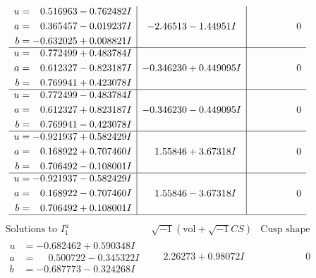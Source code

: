 \documentclass[1p]{elsarticle_modified}
\theoremstyle{definition}
\newcommand{\I}{\sqrt{-1}}
\begin{document}
$$\begin{array}{c|c|c}
\begin{aligned}
u &= \phantom{-}0.516963 - 0.762482 I \\
a &= \phantom{-}0.365457 - 0.019237 I \\
b &= -0.632025 + 0.008821 I\end{aligned}
 & -2.46513 - 1.44951 I & \phantom{-0.000000 } 0 \\ \hline\begin{aligned}
u &= \phantom{-}0.772499 + 0.483784 I \\
a &= \phantom{-}0.612327 - 0.823187 I \\
b &= \phantom{-}0.769941 + 0.423078 I\end{aligned}
 & -0.346230 + 0.449095 I & \phantom{-0.000000 } 0 \\ \hline\begin{aligned}
u &= \phantom{-}0.772499 - 0.483784 I \\
a &= \phantom{-}0.612327 + 0.823187 I \\
b &= \phantom{-}0.769941 - 0.423078 I\end{aligned}
 & -0.346230 - 0.449095 I & \phantom{-0.000000 } 0 \\ \hline\begin{aligned}
u &= -0.921937 + 0.582429 I \\
a &= \phantom{-}0.168922 + 0.707460 I \\
b &= \phantom{-}0.706492 - 0.108001 I\end{aligned}
 & \phantom{-}1.55846 + 3.67318 I & \phantom{-0.000000 } 0 \\ \hline\begin{aligned}
u &= -0.921937 - 0.582429 I \\
a &= \phantom{-}0.168922 - 0.707460 I \\
b &= \phantom{-}0.706492 + 0.108001 I\end{aligned}
 & \phantom{-}1.55846 - 3.67318 I & \phantom{-0.000000 } 0\\
 \hline 
 \end{array}$$\newpage$$\begin{array}{c|c|c}  
\text{Solutions to }I^u_{1}& \I (\text{vol} + \sqrt{-1}CS) & \text{Cusp shape}\\
 \hline 
\begin{aligned}
u &= -0.682462 + 0.590348 I \\
a &= \phantom{-}0.500722 - 0.345322 I \\
b &= -0.687773 - 0.324268 I\end{aligned}
 & \phantom{-}2.26273 + 0.98072 I & \phantom{-0.000000 } 0 \\ \hline\begin{aligned}

\end{aligned}
\end{array}$$
\end{document}
